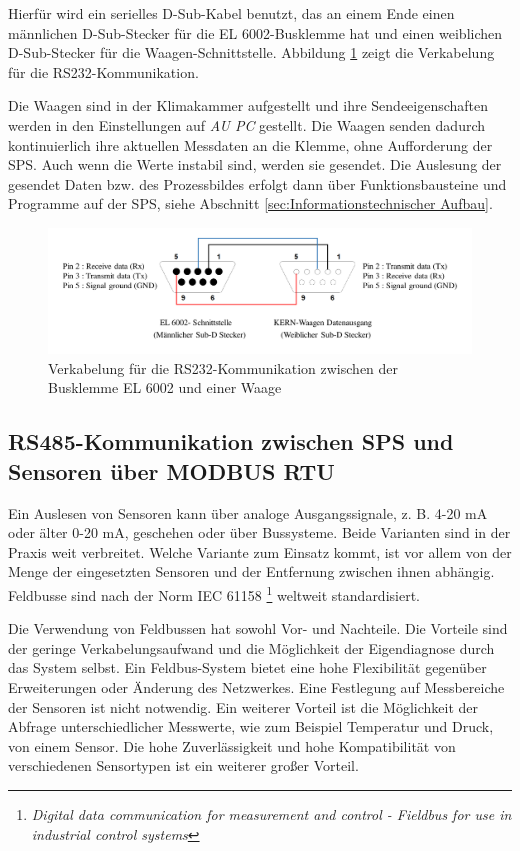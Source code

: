 Hierfür wird ein serielles D-Sub-Kabel benutzt, das an einem Ende einen männlichen D-Sub-Stecker für die EL 6002-Busklemme hat und einen weiblichen D-Sub-Stecker für die Waagen-Schnittstelle. Abbildung \ref{fig:RS232} zeigt die Verkabelung für die RS232-Kommunikation. 

Die Waagen sind in der Klimakammer aufgestellt und ihre Sendeeigenschaften  werden in den Einstellungen auf \textit{AU PC} gestellt. Die Waagen senden dadurch kontinuierlich ihre aktuellen Messdaten an die Klemme, ohne Aufforderung der SPS. Auch wenn die Werte instabil sind, werden sie gesendet. Die Auslesung der gesendet Daten bzw. des Prozessbildes erfolgt dann über Funktionsbausteine und Programme auf der SPS, siehe Abschnitt \ref{sec:Informationstechnischer Aufbau}.

\begin{figure}[htb]
\centering		\includegraphics[width=1.05\textwidth]{Pictures/RS232_Verkabelung.pdf}
\caption{Verkabelung für die RS232-Kommunikation zwischen der Busklemme EL 6002 und einer Waage }
\label{fig:RS232}
\end{figure}

\subsection{RS485-Kommunikation zwischen SPS und Sensoren über MODBUS RTU}
\label{subsec:Modbus}

Ein Auslesen von Sensoren kann über analoge Ausgangssignale, z. B. 4-20 mA oder älter 0-20 mA, geschehen oder über Bussysteme. Beide Varianten sind in der Praxis weit verbreitet. Welche Variante zum Einsatz kommt, ist vor allem von der Menge der eingesetzten Sensoren und der Entfernung zwischen ihnen abhängig.
Feldbusse sind nach der Norm IEC 61158 \footnote{\textit{Digital data communication for measurement and control - Fieldbus for use in industrial control systems}} weltweit standardisiert. 

Die Verwendung von Feldbussen hat sowohl Vor- und Nachteile. Die Vorteile sind der geringe Verkabelungsaufwand und die Möglichkeit der Eigendiagnose durch das System selbst. Ein Feldbus-System bietet eine hohe Flexibilität gegenüber Erweiterungen oder Änderung des Netzwerkes. Eine Festlegung auf Messbereiche der Sensoren ist nicht notwendig. Ein weiterer Vorteil ist die Möglichkeit der Abfrage unterschiedlicher Messwerte, wie zum Beispiel Temperatur und Druck, von einem Sensor. Die hohe Zuverlässigkeit und hohe Kompatibilität von verschiedenen Sensortypen ist ein weiterer großer Vorteil.

